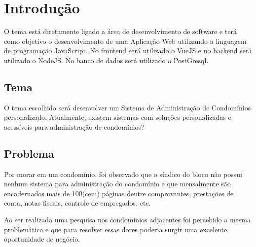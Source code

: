 \chapter{Introdução}
\label{chp:introduction}
O tema está diretamente ligado a área de desenvolvimento de software e terá como
objetivo o desenvolvimento de uma Aplicação Web utilizando a linguagem de programação
JavaScript. No frontend será utilizado o VueJS e no backend será utilizado
o NodeJS. No banco de dados será utilizado o PostGresql.

\section{Tema}
O tema escolhido será desenvolver um Sistema de Administração de Condomínios
personalizado. Atualmente, existem sistemas com soluções personalizadas e acessíveis
para administração de condomínios?
\section{Problema}
Por morar em um condomínio, foi observado que o síndico do bloco não possui
nenhum sistema para administração do condomínio e que mensalmente são encadernados
mais de 100(cem) páginas dentre comprovantes, prestações de conta, notas fiscais,
controle de empregados, etc.

Ao ser realizada uma pesquisa nos condomínios adjacentes foi percebido a mesma
problemática e que para resolver essas dores poderia surgir uma excelente
oportunidade de negócio.

